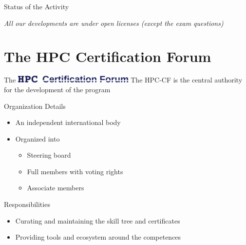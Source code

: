 \documentclass[compress,aspectratio=169]{beamer}
\begin{document}
\begin{frame}{Status of the Activity}
\medskip

\textit{All our developments are under open licenses (except the exam questions)}
\end{frame}


\section{The HPC Certification Forum}
\sectionIntroHidden

\begin{frame}{The \includegraphics[width=0.45\textwidth]{hpccf-full}}
	The HPC-CF is the central authority for the development of the program

	\begin{block}{Organization Details}
		\begin{itemize}
			\item An independent international body
			\item Organized into
				\begin{itemize}
					\item Steering board
					\item Full members with voting rights
					\item Associate members
				\end{itemize}
		\end{itemize}
	\end{block}

	\begin{block}{Responsibilities}
		\begin{itemize}
			\item Curating and maintaining the skill tree and certificates
			\item Providing tools and ecosystem around the competences
		\end{itemize}
	\end{block}
\end{frame}
\end{document}
